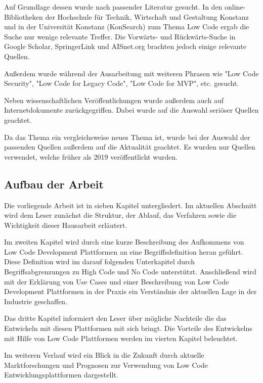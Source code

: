 \documentclass[12pt]{article} %
\begin{document}
	Auf Grundlage dessen wurde nach passender Literatur gesucht. In den online-Bibliotheken der Hochschule für Technik, Wirtschaft und Gestaltung Konstanz und in der Universität Konstanz (KonSearch) zum Thema Low Code ergab die Suche nur wenige relevante Treffer. Die Vorwärts- und Rückwärts-Suche in Google Scholar, SpringerLink und AISnet.org brachten jedoch einige relevante Quellen. 
	
	Außerdem wurde während der Ausarbeitung mit weiteren Phrasen wie "Low Code Security", "Low Code for Legacy Code", "Low Code for MVP", etc. gesucht. \newline 
	 
	Neben wissenschaftlichen Veröffentlichungen wurde außerdem auch auf Internetdokumente zurückgegriffen. Dabei wurde auf die Auswahl seriöser Quellen geachtet.
	
	Da das Thema ein vergleichsweise neues Thema ist, wurde bei der Auswahl der passenden Quellen außerdem auf die Aktualität geachtet. Es wurden nur Quellen verwendet, welche früher als 2019 veröffentlicht wurden.
	
	\subsection{Aufbau der Arbeit}
	Die vorliegende Arbeit ist in sieben Kapitel untergliedert. Im aktuellen Abschnitt wird dem Leser zunächst die Struktur, der Ablauf, das Verfahren sowie die Wichtigkeit dieser Hausarbeit erläutert. \newline
	
	Im zweiten Kapitel wird durch eine kurze Beschreibung des Aufkommens von Low Code Development Plattformen an eine Begriffsdefinition heran geführt. Diese Definition wird im darauf folgenden Unterkapitel durch Begriffsabgrenzungen zu High Code und No Code unterstützt. Anschließend wird mit der Erklärung von Use Cases und einer Beschreibung von Low Code Development Plattformen in der Praxis ein Verständnis der aktuellen Lage in der Industrie geschaffen. \newline
	
	Das dritte Kapitel informiert den Leser über mögliche Nachteile die das Entwickeln mit diesen Plattformen mit sich bringt. 
	Die Vorteile des Entwickelns mit Hilfe von Low Code Plattformen werden im vierten Kapitel beleuchtet. \newline
	
	Im weiteren Verlauf wird ein Blick in die Zukunft durch aktuelle Marktforschungen und Prognosen zur Verwendung von Low Code Entwicklungsplattformen dargestellt. 
	
\end{document}
